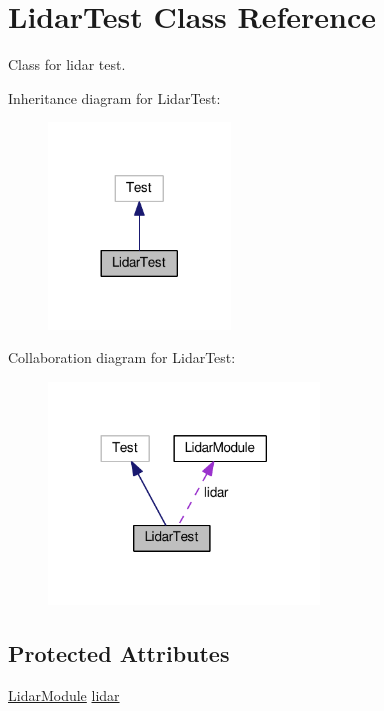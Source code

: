 \hypertarget{class_lidar_test}{}\section{Lidar\+Test Class Reference}
\label{class_lidar_test}


Class for lidar test.  




Inheritance diagram for Lidar\+Test\+:
\nopagebreak
\begin{figure}[H]
\begin{center}
\leavevmode
\includegraphics[width=137pt]{class_lidar_test__inherit__graph}
\end{center}
\end{figure}


Collaboration diagram for Lidar\+Test\+:
\nopagebreak
\begin{figure}[H]
\begin{center}
\leavevmode
\includegraphics[width=204pt]{class_lidar_test__coll__graph}
\end{center}
\end{figure}
\subsection*{Protected Attributes}
\begin{DoxyCompactItemize}
\item 
\hyperlink{class_lidar_module}{Lidar\+Module} \hyperlink{class_lidar_test_ab19e318f3d99df132e015dd8c77c4898}{lidar}
\end{DoxyCompactItemize}


